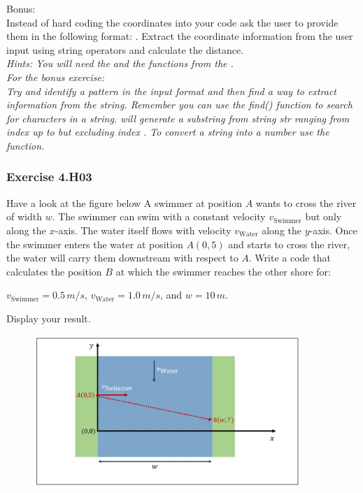 Bonus:\\
Instead of hard coding the coordinates into your code ask the user to provide them in the
following format: {}. Extract the coordinate information from the user input using
string operators and calculate the distance.\\


\textit{Hints:
You will need the {} and the {} functions from the {}.\\
For the bonus exercise:\\
Try and identify a pattern in the input format and then find a way to extract information
from the string. Remember you can use the find() function to search for characters in a
string. {} will generate a substring from string str ranging from index {} up to but excluding index {}. To convert a string into a number use the {} function.}\\[1cm]



\subsubsection*{Exercise 4.H03 \red{[M]}}
Have a look at the figure below
A swimmer at position $A$ wants to cross the river of width $w$. The swimmer can swim with a
constant velocity $v_{\textrm{Swimmer}}$ but only along the $x$-axis. The water itself flows with velocity $v_{\textrm{Water}}$ along the $y$-axis. Once the swimmer enters the water at position $A (0,5)$ and starts to cross the river, the water will carry them downstream with respect to $A$. Write a code that calculates the position $B$ at which the swimmer reaches the other shore for:
\begin{center}
$v_{\textrm{Swimmer}} = 0.5 \, m/s$, $v_{\textrm{Water}} = 1.0 \, m/s$, and $w = 10 \, m$.
\end{center}
Display your result.
\begin{figure}[H]
		\centering
		\includegraphics[width=0.9\textwidth]{../IMG/4H03.png} 
\end{figure}


